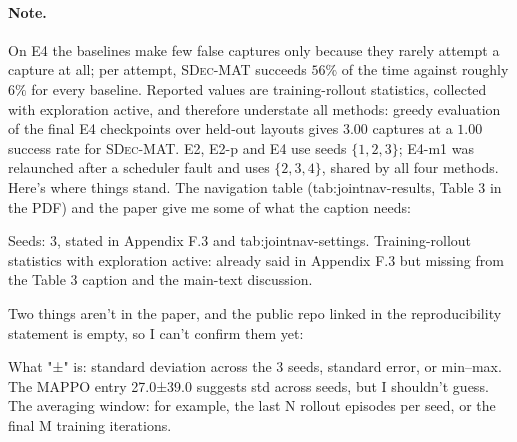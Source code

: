 \paragraph{Note.}
On E4 the baselines make few false captures only because they rarely attempt a
capture at all; per attempt, \textsc{SDec-MAT} succeeds $56\%$ of the time
against roughly $6\%$ for every baseline. Reported values are training-rollout
statistics, collected with exploration active, and therefore understate all
methods: greedy evaluation of the final E4 checkpoints over held-out layouts
gives $3.00$ captures at a $1.00$ success rate for \textsc{SDec-MAT}.
E2, E2-p and E4 use seeds $\{1,2,3\}$; E4-m1 was relaunched after a scheduler
fault and uses $\{2,3,4\}$, shared by all four methods.
Here's where things stand. The navigation table (tab:jointnav-results, Table 3 in the PDF) and the paper give me some of what the caption needs:

Seeds: 3, stated in Appendix F.3 and tab:jointnav-settings.
Training-rollout statistics with exploration active: already said in Appendix F.3 but missing from the Table 3 caption and the main-text discussion.

Two things aren't in the paper, and the public repo linked in the reproducibility statement is empty, so I can't confirm them yet:

What "±" is: standard deviation across the 3 seeds, standard error, or min–max. The MAPPO entry 27.0±39.0 suggests std across seeds, but I shouldn't guess.
The averaging window: for example, the last N rollout episodes per seed, or the final M training iterations.